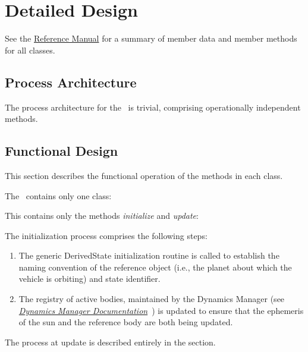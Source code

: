 
%
%
% 
%

\section{Detailed Design}
See the \href{file:refman.pdf}{Reference Manual}\cite{derivedstatebib:ReferenceManual} for a summary of member data and member methods for all classes.  

\subsection{Process Architecture}
The process architecture for the \SolarBetaDesc\ is trivial, comprising operationally independent methods.

\subsection{Functional Design}
This section describes the functional operation of the methods in each class.

The \SolarBetaDesc\ contains only one class:
\begin{itemize}

This contains only the methods \textit{initialize} and \textit{update}:
\begin{enumerate}
The initialization process comprises the following steps:
\begin{enumerate}
\item{} The generic DerivedState initialization routine is called to establish the naming convention of the reference object (i.e., the planet about which the vehicle is orbiting) and state identifier.
\item{} The registry of active bodies, maintained by the Dynamics Manager (see \href{file:\JEODHOME/models/dynamics/dyn_manager/docs/dyn_manager.pdf}{\em Dynamics Manager Documentation}~\cite{dynenv:DYNMANAGER}) is updated to ensure that the ephemeris of the sun and the reference body are both being updated.
\end{enumerate}

The process at update is described entirely in the  section.


\end{enumerate}
\end{itemize}




